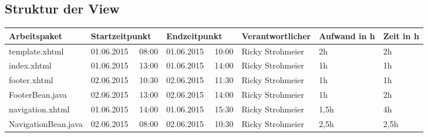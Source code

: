 \begin{landscape}
	\subsection{Struktur der View}
	\begin{tabular}{|p{10.3cm}|p{3.2cm}|p{3.2cm}|p{3.5cm}|p{1.7cm}|p{1.5cm}|}
		\hline  \textbf{Arbeitspaket} & \textbf{Startzeitpunkt} & \textbf{Endzeitpunkt} & \textbf{Verantwortlicher}  & \textbf{Aufwand in h} & \textbf{Zeit in h}\\ 
		\hline   template.xhtml                   & 01.06.2015 \ \ 08:00     & 01.06.2015 \ \ 10:00     & Ricky Strohmeier &      2h    &    2h  \\
		\hline   index.xhtml                      & 01.06.2015 \ \ 13:00     & 01.06.2015 \ \ 14:00     & Ricky Strohmeier &      1h    &    1h  \\
		\hline   footer.xhtml                     & 02.06.2015 \ \ 10:30     & 02.06.2015 \ \ 11:30     & Ricky Strohmeier &      1h    &    1h\\ 
		\hline   FooterBean.java                  & 02.06.2015 \ \ 13:00     & 02.06.2015 \ \ 14:00     & Ricky Strohmeier &      1h    &    2h\\ 
		\hline   navigation.xhtml                 & 01.06.2015 \ \ 14:00     & 01.06.2015 \ \ 15:30     & Ricky Strohmeier &      1,5h  &     4h \\ 
		\hline   NavigationBean.java              & 02.06.2015 \ \ 08:00     & 02.06.2015 \ \ 10:30     & Ricky Strohmeier &      2,5h  &    2,5h\\  
		\hline 
	\end{tabular} \ \\
	\ \\
	

\end{landscape}
